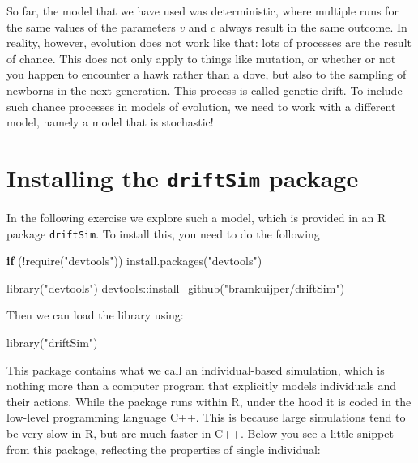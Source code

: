 \documentclass[
]{book}
\newenvironment{Shaded}{\begin{snugshade}}{\end{snugshade}}
\newcommand{\ControlFlowTok}[1]{\textcolor[rgb]{0.13,0.29,0.53}{\textbf{#1}}}
\newcommand{\FunctionTok}[1]{\textcolor[rgb]{0.00,0.00,0.00}{#1}}
\newcommand{\NormalTok}[1]{#1}
\newcommand{\SpecialCharTok}[1]{\textcolor[rgb]{0.00,0.00,0.00}{#1}}
\newcommand{\StringTok}[1]{\textcolor[rgb]{0.31,0.60,0.02}{#1}}
\begin{document}
So far, the model that we have used was deterministic, where multiple runs for the same values of the parameters \(v\) and \(c\) always result in the same outcome. In reality, however, evolution does not work like that: lots of processes are the result of chance. This does not only apply to things like mutation, or whether or not you happen to encounter a hawk rather than a dove, but also to the sampling of newborns in the next generation. This process is called genetic drift. To include such chance processes in models of evolution, we need to work with a different model, namely a model that is stochastic!

\hypertarget{installing-the-driftsim-package}{%
\section{\texorpdfstring{Installing the \texttt{driftSim} package}{Installing the driftSim package}}\label{installing-the-driftsim-package}}

In the following exercise we explore such a model, which is provided in an R package \texttt{driftSim}. To install this, you need to do the following

\begin{Shaded}
\begin{Highlighting}[]
\ControlFlowTok{if}\NormalTok{ (}\SpecialCharTok{!}\FunctionTok{require}\NormalTok{(}\StringTok{"devtools"}\NormalTok{)) }\FunctionTok{install.packages}\NormalTok{(}\StringTok{"devtools"}\NormalTok{)}

\FunctionTok{library}\NormalTok{(}\StringTok{"devtools"}\NormalTok{)}
\NormalTok{devtools}\SpecialCharTok{::}\FunctionTok{install\_github}\NormalTok{(}\StringTok{"bramkuijper/driftSim"}\NormalTok{)}
\end{Highlighting}
\end{Shaded}

Then we can load the library using:

\begin{Shaded}
\begin{Highlighting}[]
\FunctionTok{library}\NormalTok{(}\StringTok{"driftSim"}\NormalTok{)}
\end{Highlighting}
\end{Shaded}

This package contains what we call an individual-based simulation, which is nothing more than a computer program that explicitly models individuals and their actions. While the package runs within R, under the hood it is coded in the low-level programming language C++. This is because large simulations tend to be very slow in R, but are much faster in C++. Below you see a little snippet from this package, reflecting the properties of single individual:
\end{document}

